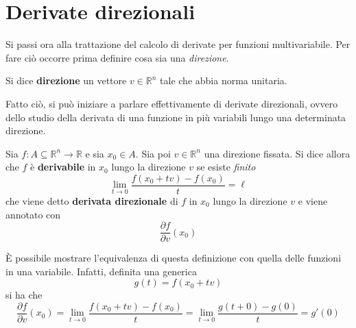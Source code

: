 \section{Derivate direzionali}
Si passi ora alla trattazione del calcolo di derivate per funzioni multivariabile. Per fare ciò occorre prima definire cosa sia una \textit{direzione}.
\begin{definition} \label{Def: Direzione}
    Si dice \textbf{direzione} un vettore $v \in \mathbb{R}^n$ tale che abbia norma unitaria. 
\end{definition}
Fatto ciò, si può iniziare a parlare effettivamente di derivate direzionali, ovvero dello studio della derivata di una funzione in più variabili lungo una determinata direzione.
\begin{definition}
    Sia $f: A \subseteq \mathbb{R}^n \to \mathbb{R}$ e sia $x_0 \in A$. Sia poi $v \in \mathbb{R}^n$ una direzione fissata.
    Si dice allora che $f$ è \textbf{derivabile} in $x_0$ lungo la direzione $v$ se esiste \textit{finito}
    \begin{equation*}
        \lim_{t \to 0}{\frac{f(x_0+tv)-f(x_0)}{t}}= \ell
    \end{equation*}
    che viene detto \textbf{derivata direzionale} di $f$ in $x_0$ lungo la direzione $v$ e viene annotato con 
    \begin{equation*}
        \frac{\partial{f}}{\partial{v}}(x_0)
    \end{equation*}
    \end{definition}
\begin{oss}
    È possibile mostrare l'equivalenza di questa definizione con quella delle funzioni in una variabile. Infatti, definita una generica
    \begin{equation*}
        g(t)=f(x_0+tv)
    \end{equation*}
    si ha che 
    \begin{equation*}
        \frac{\partial{f}}{\partial{v}}(x_0) = \lim_{t \to 0}{\frac{f(x_0+tv)-f(x_0)}{t}} = \lim_{t \to 0}{\frac{g(t+0)-g(0)}{t}}=g'(0)
    \end{equation*}
\end{oss}

